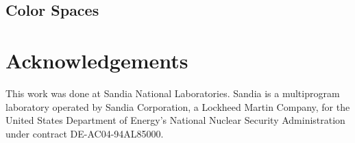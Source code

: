 \documentclass[twocolumn]{article}
\begin{document}

\subsection{Color Spaces}
\label{sec:PreviousWork:ColorSpaces}

\section{Acknowledgements}


This work was done at Sandia National Laboratories.  Sandia is a
multiprogram laboratory operated by Sandia Corporation, a Lockheed Martin
Company, for the United States Department of Energy's National Nuclear
Security Administration under contract DE-AC04-94AL85000.



\end{document}
